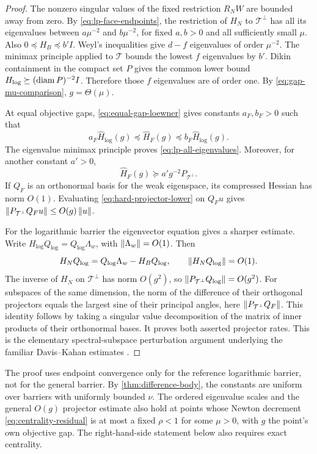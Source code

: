 \begin{proof}
The nonzero singular values of the fixed restriction $R_NW$ are
bounded away from zero. By \eqref{eq:lp-face-endpoints}, the restriction
of $H_N$ to $\mathcal T^\perp$ has all its eigenvalues between
$a\mu^{-2}$ and $b\mu^{-2}$, for fixed $a,b>0$ and all sufficiently small $\mu$.
Also $0\preceq H_B\preceq b'I$. Weyl's inequalities give $d-f$
eigenvalues of order $\mu^{-2}$. The minimax principle applied to
$\mathcal T$ bounds the lowest $f$ eigenvalues by $b'$. Dikin
containment in the compact set $P$ gives the common lower bound
$H_{\log}\succeq (\operatorname{diam} P)^{-2}I$. Therefore those $f$ eigenvalues
are of order one. By \eqref{eq:gap-mu-comparison}, $g=\Theta(\mu)$.

At equal objective gaps, \eqref{eq:equal-gap-loewner} gives constants
$a_F,b_F>0$ such that
\begin{equation}
 a_F\widehat H_{\log}(g)\preceq\widehat H_F(g)
 \preceq b_F\widehat H_{\log}(g).
 \label{eq:lp-reference-comparison}
\end{equation}
The eigenvalue minimax principle proves
\eqref{eq:lp-all-eigenvalues}. Moreover, for another constant $a'>0$,
\begin{equation}
 \widehat H_F(g)\succeq a'g^{-2}P_{\mathcal T^\perp}.
 \label{eq:hard-projector-lower}
\end{equation}
If $Q_F$ is an orthonormal basis for the weak eigenspace, its compressed
Hessian has norm $O(1)$. Evaluating \eqref{eq:hard-projector-lower}
on $Q_Fu$ gives
$\left\lVert P_{\mathcal T^\perp}Q_Fu\right\rVert\leq O(g)\left\lVert u\right\rVert$.

For the logarithmic barrier the eigenvector equation gives a sharper
estimate. Write $H_{\log}Q_{\log}=Q_{\log}\Lambda_w$, with
$\left\lVert \Lambda_w\right\rVert=O(1)$. Then
\[
 H_NQ_{\log}=Q_{\log}\Lambda_w-H_BQ_{\log},
 \qquad \left\lVert H_NQ_{\log}\right\rVert=O(1).
\]
The inverse of $H_N$ on $\mathcal T^\perp$ has norm $O(g^2)$, so
$\left\lVert P_{\mathcal T^\perp}Q_{\log}\right\rVert=O(g^2)$.
For subspaces of the same dimension, the norm of the difference of
their orthogonal projectors equals the largest sine of their principal
angles, here $\left\lVert P_{\mathcal T^\perp}Q_F\right\rVert$. This identity follows
by taking a singular value decomposition of the matrix of inner
products of their orthonormal bases. It proves both asserted projector
rates. This is the elementary spectral-subspace perturbation argument
underlying the familiar Davis--Kahan estimates \citep{daviskahan1970}.
\end{proof}

The proof uses endpoint convergence only for the reference logarithmic
barrier, not for the general barrier. By \cref{thm:difference-body}, the constants are
uniform over barriers with uniformly bounded $\nu$. The ordered
eigenvalue scales and the general $O(g)$ projector estimate also hold
at points whose Newton decrement \eqref{eq:centrality-residual} is at
most a fixed $\rho<1$ for some $\mu>0$, with $g$ the point's own
objective gap. The
right-hand-side statement below also requires exact centrality.

